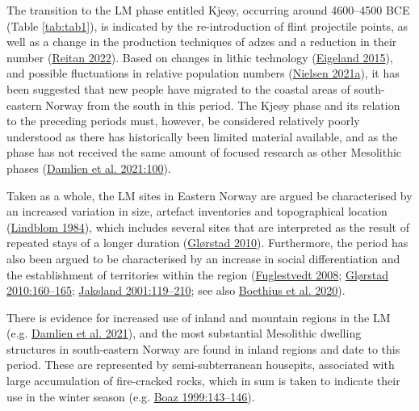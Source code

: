 \documentclass[
  12pt,
  a4paper,
  oneside]{book}
\begin{document}
The transition to the LM phase entitled Kjeøy, occurring around 4600--4500 BCE (Table \ref{tab:tab1}), is indicated by the re-introduction of flint projectile points, as well as a change in the production techniques of adzes and a reduction in their number (\protect\hyperlink{ref-reitan2022}{Reitan 2022}). Based on changes in lithic technology (\protect\hyperlink{ref-eigeland2015}{Eigeland 2015}), and possible fluctuations in relative population numbers (\protect\hyperlink{ref-nielsen2021}{Nielsen 2021a}), it has been suggested that new people have migrated to the coastal areas of south-eastern Norway from the south in this period. The Kjeøy phase and its relation to the preceding periods must, however, be considered relatively poorly understood as there has historically been limited material available, and as the phase has not received the same amount of focused research as other Mesolithic phases (\protect\hyperlink{ref-damlien2021}{Damlien et al. 2021:100}).

Taken as a whole, the LM sites in Eastern Norway are argued be characterised by an increased variation in size, artefact inventories and topographical location (\protect\hyperlink{ref-lindblom1984}{Lindblom 1984}), which includes several sites that are interpreted as the result of repeated stays of a longer duration (\protect\hyperlink{ref-glorstad2010}{Glørstad 2010}). Furthermore, the period has also been argued to be characterised by an increase in social differentiation and the establishment of territories within the region (\protect\hyperlink{ref-fuglestvedt2008}{Fuglestvedt 2008}; \protect\hyperlink{ref-glorstad2010}{Glørstad 2010:160--165}; \protect\hyperlink{ref-jaksland2001}{Jaksland 2001:119--210}; see also \protect\hyperlink{ref-boethius2020}{Boethius et al. 2020}).

There is evidence for increased use of inland and mountain regions in the LM (e.g. \protect\hyperlink{ref-damlien2021}{Damlien et al. 2021}), and the most substantial Mesolithic dwelling structures in south-eastern Norway are found in inland regions and date to this period. These are represented by semi-subterranean housepits, associated with large accumulation of fire-cracked rocks, which in sum is taken to indicate their use in the winter season (e.g. \protect\hyperlink{ref-boaz1999}{Boaz 1999:143--146}).
\end{document}
